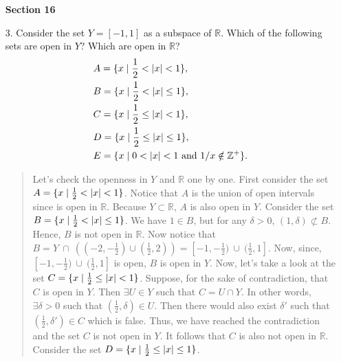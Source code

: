 \documentclass[12pt, a4paper]{article}
\newcommand{\pints}{\mathbb{Z}^+} %
\newcommand{\reals}{\mathbb{R}} %
\DeclarePairedDelimiter\abs{\lvert}{\rvert}
\begin{document}
\begin{itemize}
\item[]
\item[]
\item[]

{\large \textbf{Section 16}}
\vspace{0.3cm}
\item[3.]
Consider the set $Y = [-1, 1]$ as a subspace of $\reals$.
Which of the following sets are open in $Y$? Which are open in $\reals$?
\begin{align*}
&A = \{x \mid \frac{1}{2} < \abs{x} < 1\},\\
&B = \{x \mid \frac{1}{2} < \abs{x} \leq 1\},\\
&C = \{x \mid \frac{1}{2} \leq \abs{x} < 1\},\\
&D = \{x \mid \frac{1}{2} \leq \abs{x} \leq 1\},\\
&E = \{x \mid 0 < \abs{x} < 1 \ \mbox{and} \ 1/x \notin \pints\}.
\end{align*}
\begin{quote}
Let's check the openness in $Y$ and $\reals$ one by one.
\newline
\newline
First consider the set $A = \{x \mid \frac{1}{2} < \abs{x} < 1\}$.
Notice that $A$ is the union of open intervals since is open in $\reals$.
Because $Y \subset \reals$, $A$ is also open in $Y$.
\newline
\newline
Consider the set $B = \{x \mid \frac{1}{2} < \abs{x} \leq 1\}$.
We have $1 \in B$, but for any $\delta > 0$, $(1, \delta) \not\subset B$.
Hence, $B$ is not open in $\reals$. Now notice that $B = Y \ \cap \ ((-2, -\frac{1}{2}) \cup (\frac{1}{2}, 2)) = [-1, -\frac{1}{2}) \ \cup \ (\frac{1}{2}, 1]$.
Now, since, $[-1, -\frac{1}{2}) \ \cup \ (\frac{1}{2}, 1]$ is open, $B$ is open in $Y$.
\newline
\newline
Now, let's take a look at the set $C = \{x \mid \frac{1}{2} \leq \abs{x} < 1\}$.
Suppose, for the sake of contradiction, that $C$ is open in $Y$.
Then $\exists U \in Y$ such that $C = U \cap Y$. In other words,
$\exists \delta > 0$ such that $(\frac{1}{2}, \delta) \in U$.
Then there would also exist $\delta\prime$ such that $(\frac{1}{2}, \delta\prime) \in C$
which is false. Thus, we have reached the contradiction and the set $C$
is not open in $Y$. It follows that $C$ is also not open in $\reals$.
\newline
\newline
Consider the set $D = \{x \mid \frac{1}{2} \leq \abs{x} \leq 1\}$.

\end{quote}
\end{itemize}
\end{document}
